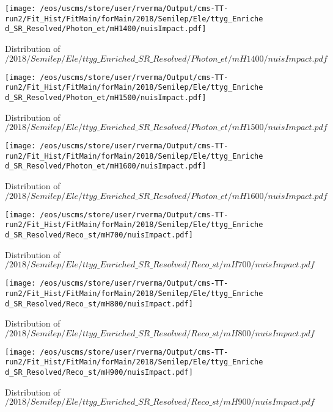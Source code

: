 \begin{figure}
\centering
\texttt{[image: /eos/uscms/store/user/rverma/Output/cms-TT-run2/Fit\_Hist/FitMain/forMain/2018/Semilep/Ele/ttyg\_Enriched\_SR\_Resolved/Photon\_et/mH1400/nuisImpact.pdf]}
\caption{Distribution of $/2018/Semilep/Ele/ttyg\_Enriched\_SR\_Resolved/Photon\_et/mH1400/nuisImpact.pdf$}
\end{figure}

\begin{figure}
\centering
\texttt{[image: /eos/uscms/store/user/rverma/Output/cms-TT-run2/Fit\_Hist/FitMain/forMain/2018/Semilep/Ele/ttyg\_Enriched\_SR\_Resolved/Photon\_et/mH1500/nuisImpact.pdf]}
\caption{Distribution of $/2018/Semilep/Ele/ttyg\_Enriched\_SR\_Resolved/Photon\_et/mH1500/nuisImpact.pdf$}
\end{figure}

\begin{figure}
\centering
\texttt{[image: /eos/uscms/store/user/rverma/Output/cms-TT-run2/Fit\_Hist/FitMain/forMain/2018/Semilep/Ele/ttyg\_Enriched\_SR\_Resolved/Photon\_et/mH1600/nuisImpact.pdf]}
\caption{Distribution of $/2018/Semilep/Ele/ttyg\_Enriched\_SR\_Resolved/Photon\_et/mH1600/nuisImpact.pdf$}
\end{figure}

\begin{figure}
\centering
\texttt{[image: /eos/uscms/store/user/rverma/Output/cms-TT-run2/Fit\_Hist/FitMain/forMain/2018/Semilep/Ele/ttyg\_Enriched\_SR\_Resolved/Reco\_st/mH700/nuisImpact.pdf]}
\caption{Distribution of $/2018/Semilep/Ele/ttyg\_Enriched\_SR\_Resolved/Reco\_st/mH700/nuisImpact.pdf$}
\end{figure}

\begin{figure}
\centering
\texttt{[image: /eos/uscms/store/user/rverma/Output/cms-TT-run2/Fit\_Hist/FitMain/forMain/2018/Semilep/Ele/ttyg\_Enriched\_SR\_Resolved/Reco\_st/mH800/nuisImpact.pdf]}
\caption{Distribution of $/2018/Semilep/Ele/ttyg\_Enriched\_SR\_Resolved/Reco\_st/mH800/nuisImpact.pdf$}
\end{figure}

\begin{figure}
\centering
\texttt{[image: /eos/uscms/store/user/rverma/Output/cms-TT-run2/Fit\_Hist/FitMain/forMain/2018/Semilep/Ele/ttyg\_Enriched\_SR\_Resolved/Reco\_st/mH900/nuisImpact.pdf]}
\caption{Distribution of $/2018/Semilep/Ele/ttyg\_Enriched\_SR\_Resolved/Reco\_st/mH900/nuisImpact.pdf$}
\end{figure}

